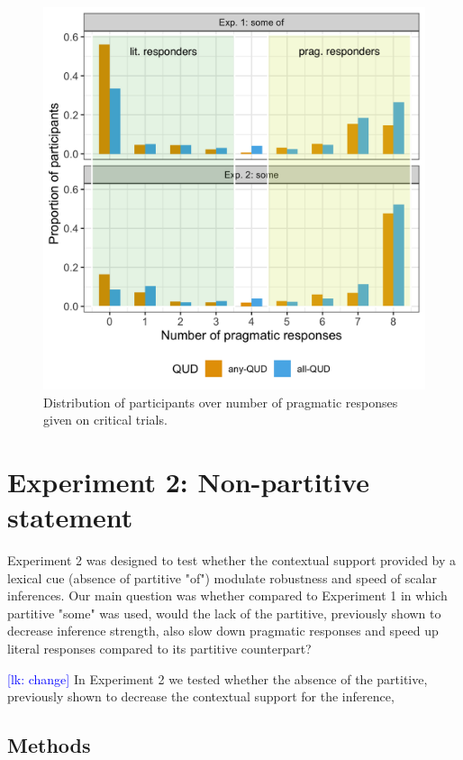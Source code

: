 \documentclass[10pt,letterpaper]{article}
\newcommand{\lk}[1]{\textcolor{Blue}{[lk: #1]}}
\begin{document}
\begin{figure}
  \includegraphics[width=\linewidth]{plots/proportion.png}
  \caption{Distribution of participants over number of pragmatic responses given on critical trials. \label{fig:proportion}}
\end{figure}

\section{Experiment 2: Non-partitive statement}
Experiment 2 was designed to test whether the contextual support provided by a lexical cue (absence of partitive "of") modulate robustness and speed of scalar inferences. Our main question was whether compared to Experiment 1 in which partitive "some" was used, would the lack of the partitive, previously shown to decrease inference strength, also slow down pragmatic responses and speed up literal responses compared to its partitive counterpart?

\lk{change}
In Experiment 2 we tested whether the absence of the partitive, previously shown to decrease the contextual support for the inference,

\subsection{Methods}
\end{document}
